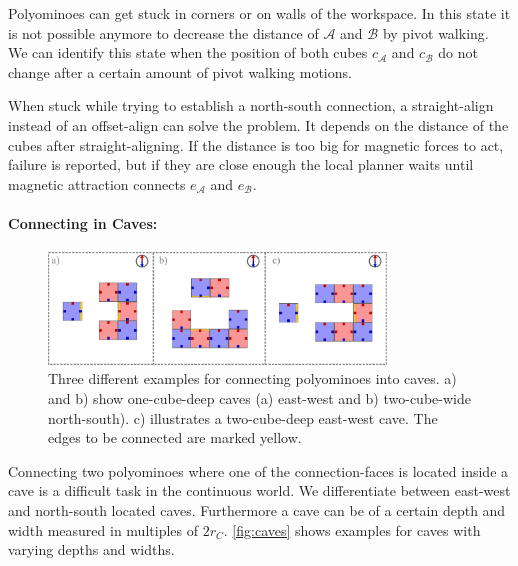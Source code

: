 Polyominoes can get stuck in corners or on walls of the workspace.
In this state it is not possible anymore to decrease the distance of $\mathcal{A}$ and $\mathcal{B}$ by pivot walking.
We can identify this state when the position of both cubes $c_\mathcal{A}$ and $c_\mathcal{B}$ do not change after a certain amount of pivot walking motions.

When stuck while trying to establish a north-south connection, a straight-align instead of an offset-align can solve the problem.
It depends on the distance of the cubes after straight-aligning.
If the distance is too big for magnetic forces to act, failure is reported, but if they are close enough the local planner waits until magnetic attraction connects $e_\mathcal{A}$ and $e_\mathcal{B}$.


\paragraph{Connecting in Caves:}

\begin{figure}
	\centering
	\includegraphics[width=0.80\textwidth]{figures/caves.pdf}
	\caption[Examples for connecting polyominoes into caves]{Three different examples for connecting polyominoes into caves. a) and b) show one-cube-deep caves (a) east-west and b) two-cube-wide north-south). c) illustrates a two-cube-deep east-west cave. The edges to be connected are marked yellow.}
	\label{fig:caves}
\end{figure}

Connecting two polyominoes where one of the connection-faces is located inside a cave is a difficult task in the continuous world.
We differentiate between east-west and north-south located caves.
Furthermore a cave can be of a certain depth and width measured in multiples of $2 r_C$.
\autoref{fig:caves} shows examples for caves with varying depths and widths.

